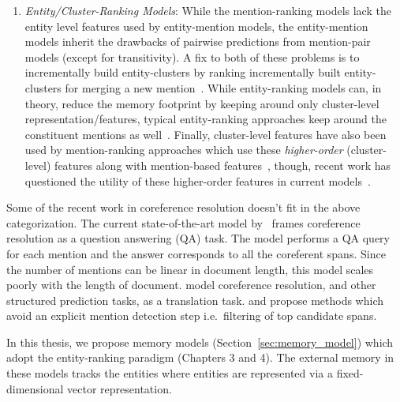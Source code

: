 \documentclass[12pt]{thesis-umich}[thesis]
\begin{document}
\begin{enumerate}
	\item \emph{Entity/Cluster-Ranking Models}:
	While the mention-ranking models lack the entity level features used by entity-mention models, the entity-mention models inherit the drawbacks of pairwise predictions from mention-pair models (except for transitivity). 
	A fix to both of these problems is to incrementally build entity-clusters by  ranking incrementally built entity-clusters for merging a new mention~\citep{rahman2011narrowing, stoyanov-eisner-2012-easy, websterC14, clark-manning-2016-improving}. While entity-ranking models can, in theory, reduce the memory footprint by keeping around only cluster-level representation/features, typical entity-ranking approaches keep around the constituent mentions as well~\citep{rahman2011narrowing, stoyanov-eisner-2012-easy, clark-manning-2015-entity}. Finally, cluster-level features have also been used by mention-ranking approaches which use these  \emph{higher-order} (cluster-level) features along with mention-based features~\citep{wiseman-etal-2016-learning, lee-etal-2017-end, lee-etal-2018-higher, joshi-etal-2019-bert, joshi-etal-2020-spanbert}, though, recent work has questioned the utility of these higher-order features in current models~\citep{xu-choi-2020-revealing}.
	
\end{enumerate}

Some of the recent work in coreference resolution doesn't fit in the above categorization. The current state-of-the-art model by~\citet{wu2019coreference} frames coreference resolution as a question answering (QA) task. The model performs a QA query for each mention and the answer corresponds to all the coreferent spans. Since the number of mentions can be linear in document length, this model scales poorly with the length of document. 
\citet{paolini2021structured} model coreference resolution, and other structured prediction tasks, as a translation task. 
\citet{kirstain-etal-2021-coreference} and \citet{dobrovolskii-2021-word} propose methods which avoid an explicit mention detection step i.e.\ filtering of top candidate spans. 


In this thesis, we propose memory models (Section~\ref{sec:memory_model}) which adopt the entity-ranking paradigm  (Chapters 3 and 4). The external memory in these models tracks the entities where entities are represented via a fixed-dimensional vector representation.   
\end{document}
